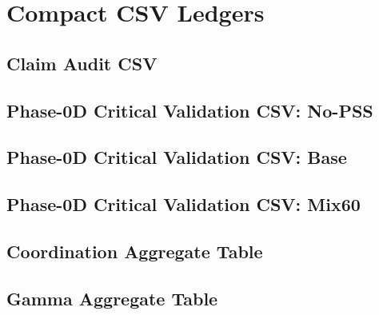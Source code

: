 \documentclass[11pt]{article}
\begin{document}
\section{Compact CSV Ledgers}

\lstset{basicstyle=\ttfamily\tiny}

\subsection{Claim Audit CSV}


\subsection{Phase-0D Critical Validation CSV: No-PSS}


\subsection{Phase-0D Critical Validation CSV: Base}


\subsection{Phase-0D Critical Validation CSV: Mix60}


\subsection{Coordination Aggregate Table}


\subsection{Gamma Aggregate Table}

\end{document}
